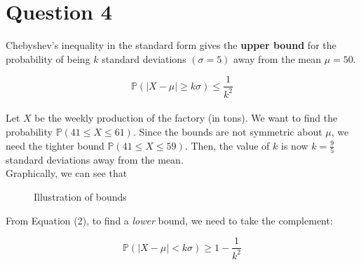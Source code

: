 \documentclass[12pt]{article}
\begin{document}
\newpage

\section*{Question 4}
Chebyshev's inequality in the standard form gives the \textbf{upper bound} for the probability of being $k$ standard deviations $(\sigma = 5)$ away from the mean $\mu = 50$. 

\begin{equation}
    \mathbb{P}(|X - \mu| \geq k\sigma) \leq \frac{1}{k^{2}}
\end{equation} \\ 

\noindent Let $X$ be the weekly production of the factory (in tons). We want to find the probability $ \mathbb{P}(41 \leq X \leq 61)$. Since the bounds are not symmetric about $\mu$, we need the tighter bound $ \mathbb{P}(41 \leq X \leq 59)$. Then, the value of $k$ is now $k = \frac{9}{5}$ standard deviations away from the mean. \\ 

\noindent Graphically, we can see that \\

\begin{figure}[H]
    \centering
    \caption{Illustration of bounds}
    \label{fig:4-ineq}
\end{figure}

\noindent From Equation (2), to find a \textit{lower} bound, we need to take the complement:

\begin{equation}
    \mathbb{P}(|X - \mu| < k\sigma) \geq 1 - \frac{1}{k^{2}}
\end{equation} \\ 
\end{document}
